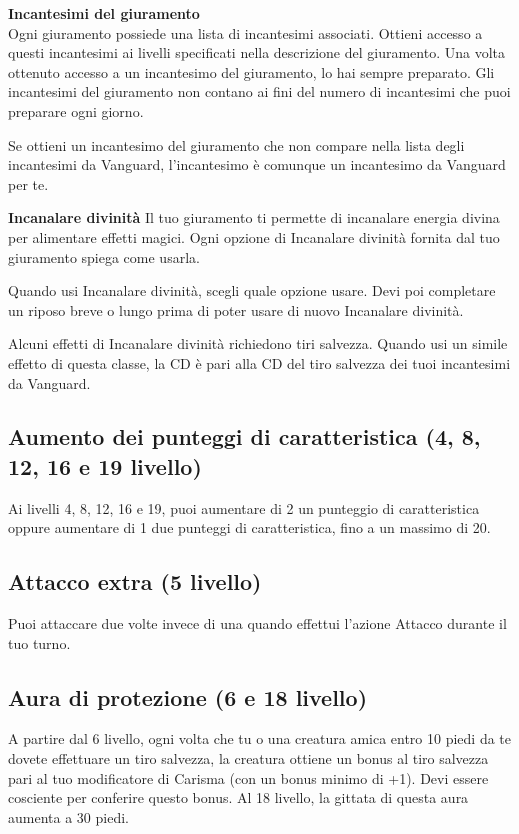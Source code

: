 \documentclass[a4paper,10pt,twoside,twocolumn,openany,bg=full,nodeprecatedcode]{dndbook}
\begin{document}
\textbf{Incantesimi del giuramento} \\ Ogni giuramento possiede una lista di incantesimi associati. Ottieni accesso a questi incantesimi ai livelli specificati nella descrizione del giuramento. Una volta ottenuto accesso a un incantesimo del giuramento, lo hai sempre preparato. Gli incantesimi del giuramento non contano ai fini del numero di incantesimi che puoi preparare ogni giorno.

Se ottieni un incantesimo del giuramento che non compare nella lista degli incantesimi da Vanguard, l'incantesimo è comunque un incantesimo da Vanguard per te.

\textbf{Incanalare divinità} Il tuo giuramento ti permette di incanalare energia divina per alimentare effetti magici. Ogni opzione di Incanalare divinità fornita dal tuo giuramento spiega come usarla.

Quando usi Incanalare divinità, scegli quale opzione usare. Devi poi completare un riposo breve o lungo prima di poter usare di nuovo Incanalare divinità.

Alcuni effetti di Incanalare divinità richiedono tiri salvezza. Quando usi un simile effetto di questa classe, la CD è pari alla CD del tiro salvezza dei tuoi incantesimi da Vanguard.

\subsection{Aumento dei punteggi di caratteristica (4\degree{}, 8\degree{}, 12\degree{}, 16\degree{} e 19\degree{} livello)}\label{Vanguard_asi}
Ai livelli 4, 8, 12, 16 e 19, puoi aumentare di 2 un punteggio di caratteristica oppure aumentare di 1 due punteggi di caratteristica, fino a un massimo di 20.

\subsection{Attacco extra (5\degree{} livello)}\label{Vanguard_extra_attack}
Puoi attaccare due volte invece di una quando effettui l'azione Attacco durante il tuo turno.

\subsection{Aura di protezione (6\degree{} e 18\degree{} livello)}\label{Vanguard_aura_of_protection}
A partire dal 6\degree{} livello, ogni volta che tu o una creatura amica entro 10 piedi da te dovete effettuare un tiro salvezza, la creatura ottiene un bonus al tiro salvezza pari al tuo modificatore di Carisma (con un bonus minimo di +1). Devi essere cosciente per conferire questo bonus. Al 18\degree{} livello, la gittata di questa aura aumenta a 30 piedi.
\end{document}

